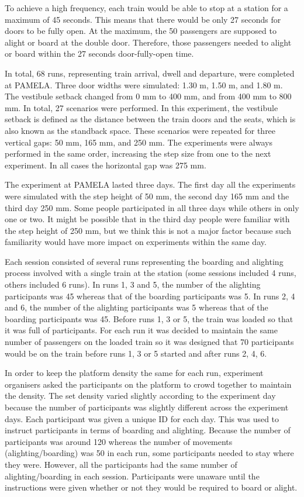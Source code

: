 To achieve a high frequency, each train would be able to stop at a station for a maximum of 45 seconds. This means that there would be only 27 seconds for doors to be fully open. At the maximum, the 50 passengers are supposed to alight or board at the double door. Therefore, those passengers needed to alight or board within the 27 seconds door-fully-open time.

In total, 68 runs, representing train arrival, dwell and departure, were completed at PAMELA. Three door widths were simulated: 1.30 m, 1.50 m, and 1.80 m. The vestibule setback changed from 0 mm to 400 mm, and from 400 mm to 800 mm. In total, 27 scenarios were performed. In this experiment, the vestibule setback is defined as the distance between the train doors and the seats, which is also known as the standback space. These scenarios were repeated for three vertical gaps: 50 mm, 165 mm, and 250 mm. The experiments were always performed in the same order, increasing the step size from one to the next experiment. In all cases the horizontal gap was 275 mm. 

The experiment at PAMELA lasted three days. The first day all the experiments were simulated with the step height of 50 mm, the second day 165 mm and the third day 250 mm. Some people participated in all three days while others in only one or two. It might be possible that in the third day people were familiar with the step height of 250 mm, but we think this is not a major factor because such familiarity would have more impact on experiments within the same day. 

Each session consisted of several runs representing the boarding and alighting process involved with a single train at the station (some sessions included 4 runs, others included 6 runs). In runs 1, 3 and 5, the number of the alighting participants was 45 whereas that of the boarding participants was 5. In runs 2, 4 and 6, the number of the alighting participants was 5 whereas that of the boarding participants was 45. Before runs 1, 3 or 5, the train was loaded so that it was full of participants. For each run it was decided to maintain the same number of passengers on the loaded train so it was designed that 70 participants would be on the train before runs 1, 3 or 5 started and after runs 2, 4, 6. 

In order to keep the platform density the same for each run, experiment organisers asked the participants on the platform to crowd together to maintain the density. The set density varied slightly according to the experiment day because the number of participants was slightly different across the experiment days. Each participant was given a unique ID for each day. This was used to instruct participants in terms of boarding and alighting. Because the number of participants was around 120 whereas the number of movements (alighting/boarding) was 50 in each run, some participants needed to stay where they were. However, all the participants had the same number of alighting/boarding in each session. Participants were unaware until the instructions were given whether or not they would be required to board or alight. 


